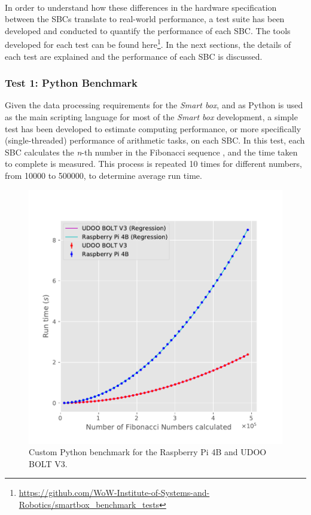 \paragraph{} In order to understand how these differences in the hardware specification between the \acs{SBC}s translate to real-world performance, a test suite has been developed and conducted to quantify the performance of each \acs{SBC}. The tools developed for each test can be found here\footnote{\url{https://github.com/WoW-Institute-of-Systems-and-Robotics/smartbox\_benchmark\_tests}}. In the next sections, the details of each test are explained and the performance of each \acs{SBC} is discussed. 

\subsubsection{Test 1: Python Benchmark}

Given the data processing requirements for the \textit{Smart box}, and as Python is used as the main scripting language for most of the \textit{Smart box} development, a simple test has been developed to estimate computing performance, or more specifically (single-threaded) performance of arithmetic tasks, on each \acs{SBC}. In this test, each \acs{SBC} calculates the \textit{n}-th number in the Fibonacci sequence \cite{pierce1951fibonacci}, and the time taken to complete is measured. This process is repeated 10 times for different numbers, from 10000 to 500000, to determine average run time.

\begin{figure}[H]
    \centering
    \includegraphics[width=0.67 \linewidth]{images/fibonacci-test.pdf}
    \caption [Custom Python benchmark for the Raspberry Pi 4B and UDOO BOLT V3.]{ Custom Python benchmark for the Raspberry Pi 4B and UDOO BOLT V3.}%
    \label{fig:fibonacci-tests}
\end{figure}

